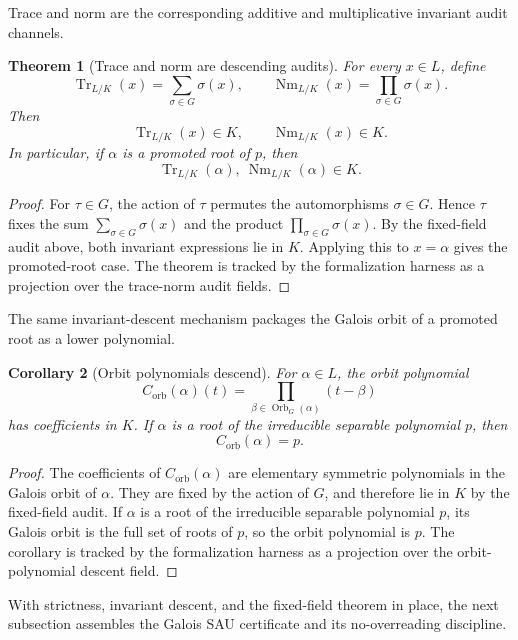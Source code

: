 \documentclass[11pt]{article}
\newcommand{\Tr}{\operatorname{Tr}}
\newcommand{\Nm}{\operatorname{Nm}}
\newcommand{\Orb}{\operatorname{Orb}}
\newtheorem{theorem}{Theorem}[section]
\newtheorem{corollary}[theorem]{Corollary}
\theoremstyle{definition}
\begin{document}
Trace and norm are the corresponding additive and multiplicative invariant
audit channels.

\begin{theorem}[Trace and norm are descending audits]
\label{thm:gal-trace-norm-descend}
For every \(x\in L\), define
\[
\Tr_{L/K}(x)=\sum_{\sigma\in G}\sigma(x),
\qquad
\Nm_{L/K}(x)=\prod_{\sigma\in G}\sigma(x).
\]
Then
\[
\Tr_{L/K}(x)\in K,
\qquad
\Nm_{L/K}(x)\in K.
\]
In particular, if \(\alpha\) is a promoted root of \(p\), then
\[
\Tr_{L/K}(\alpha),\ \Nm_{L/K}(\alpha)\in K.
\]
\end{theorem}

\begin{proof}
For \(\tau\in G\), the action of \(\tau\) permutes the automorphisms
\(\sigma\in G\).  Hence \(\tau\) fixes the sum \(\sum_{\sigma\in G}\sigma(x)\)
and the product \(\prod_{\sigma\in G}\sigma(x)\).  By the fixed-field audit
above, both invariant expressions lie in \(K\).  Applying this to \(x=\alpha\)
gives the promoted-root case.  The theorem is tracked by the formalization
harness as a projection over the trace-norm audit fields.
\end{proof}

The same invariant-descent mechanism packages the Galois orbit of a promoted
root as a lower polynomial.

\begin{corollary}[Orbit polynomials descend]
\label{cor:gal-orbit-polynomials-descend}
For \(\alpha\in L\), the orbit polynomial
\[
C_{\mathrm{orb}}(\alpha)(t)
=
\prod_{\beta\in \Orb_G(\alpha)}(t-\beta)
\]
has coefficients in \(K\).  If \(\alpha\) is a root of the irreducible separable polynomial \(p\), then
\[
C_{\mathrm{orb}}(\alpha)=p.
\]
\end{corollary}

\begin{proof}
The coefficients of \(C_{\mathrm{orb}}(\alpha)\) are elementary symmetric
polynomials in the Galois orbit of \(\alpha\).  They are fixed by the action of
\(G\), and therefore lie in \(K\) by the fixed-field audit.  If \(\alpha\) is a
root of the irreducible separable polynomial \(p\), its Galois orbit is the full
set of roots of \(p\), so the orbit polynomial is \(p\).  The corollary is
tracked by the formalization harness as a projection over the orbit-polynomial
descent field.
\end{proof}

With strictness, invariant descent, and the fixed-field theorem in place, the
next subsection assembles the Galois SAU certificate and its no-overreading
discipline.
\end{document}
